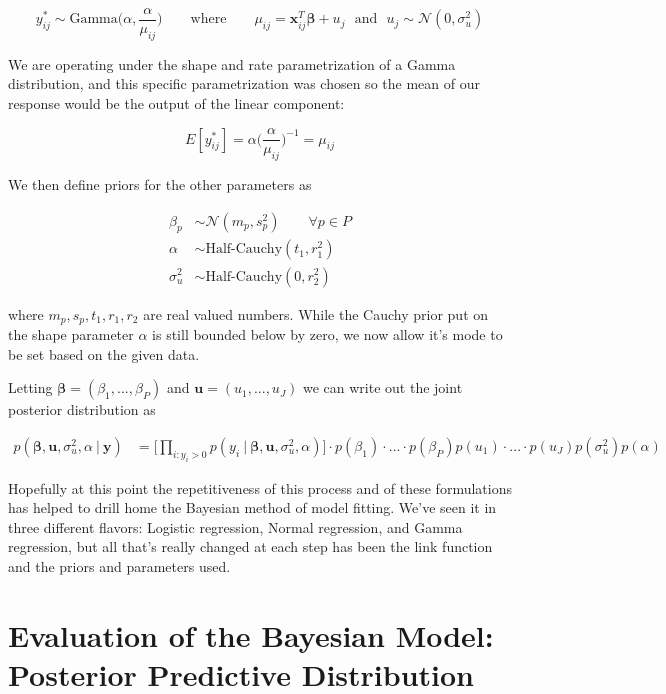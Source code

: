 \documentclass[12pt,twoside]{reedthesis}
\begin{document}
\[
y^*_{ij} \sim \text{Gamma}\bigg(\alpha, \frac{\alpha}{\mu_{ij}}\bigg) \qquad \text{where} \qquad \mu_{ij} = \mathbf{x}_{ij}^T\boldsymbol{\beta} + u_j \ \ \ \text{and} \ \ \ u_j  \sim \mathcal{N}(0, \sigma_{u}^2)
\]

We are operating under the shape and rate parametrization of a Gamma distribution, and this specific parametrization was chosen so the mean of our response would be the output of the linear component:

\[
E[y^*_{ij}] = \alpha \bigg(\frac{\alpha}{\mu_{ij}}\bigg)^{-1} = \mu_{ij}
\]

We then define priors for the other parameters as

\[
\begin{aligned}
\beta_p &\sim \mathcal{N}(m_p, s_p^2)  \qquad \forall p\in P \\
\alpha &\sim \text{Half-Cauchy}(t_1, r_1^2)\\
\sigma_{u}^2 &\sim \text{Half-Cauchy}(0, r_2^2)
\end{aligned}
\]

where \(m_p, s_p, t_1, r_1, r_2\) are real valued numbers. While the Cauchy prior put on the shape parameter \(\alpha\) is still bounded below by zero, we now allow it's mode to be set based on the given data.

Letting \(\boldsymbol{\beta} = (\beta_1, ..., \beta_P)\) and \(\mathbf{u} = (u_1, ..., u_J)\) we can write out the joint posterior distribution as

\[
\begin{aligned}
p(\boldsymbol{\beta}, \mathbf{u}, \sigma_{u}^2, \alpha \ | \ \mathbf{y}) &=\bigg[\prod_{i:y_{i} > 0}p(y_{i} \ | \ \boldsymbol{\beta},\mathbf{u}, \sigma_{u}^2, \alpha)\bigg]\cdot p(\beta_1)\cdot...\cdot p(\beta_P)p(u_1)\cdot ... \cdot p(u_J)p(\sigma_{u}^2)p( \alpha) 
\end{aligned}
\]

Hopefully at this point the repetitiveness of this process and of these formulations has helped to drill home the Bayesian method of model fitting. We've seen it in three different flavors: Logistic regression, Normal regression, and Gamma regression, but all that's really changed at each step has been the link function and the priors and parameters used.

\hypertarget{bayespred}{%
\section{Evaluation of the Bayesian Model: Posterior Predictive Distribution}\label{bayespred}}
\end{document}
